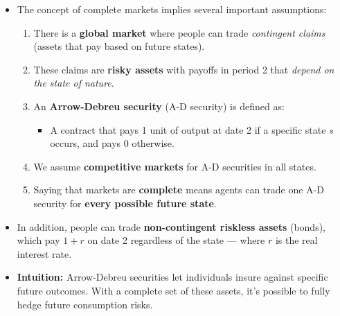 \documentclass[12pt]{article}
\begin{document}
\begin{itemize}
\item The concept of complete markets implies several important assumptions:

\begin{enumerate}
  \item There is a \textbf{global market} where people can trade \textit{contingent claims} (assets that pay based on future states).

  \item These claims are \textbf{risky assets} with payoffs in period 2 that \textit{depend on the state of nature}.

  \item An \textbf{Arrow-Debreu security} (A-D security) is defined as:
    \begin{itemize}
      \item A contract that pays 1 unit of output at date 2 if a specific state $s$ occurs, and pays 0 otherwise.
    \end{itemize}

  \item We assume \textbf{competitive markets} for A-D securities in all states.

  \item Saying that markets are \textbf{complete} means agents can trade one A-D security for \textbf{every possible future state}.
\end{enumerate}

\item In addition, people can trade \textbf{non-contingent riskless assets} (bonds), which pay $1 + r$ on date 2 regardless of the state — where $r$ is the real interest rate.

\item \textbf{Intuition:} Arrow-Debreu securities let individuals insure against specific future outcomes. With a complete set of these assets, it's possible to fully hedge future consumption risks.
\end{itemize}
\end{document}
